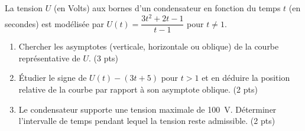 \documentclass[11pt]{article}
\begin{document}
\begin{exercice}
La tension $U$ (en Volts) aux bornes d'un condensateur en fonction du temps $t$ (en secondes) est modélisée par $U(t) = \dfrac{3t^2 + 2t - 1}{t - 1}$ pour $t \neq 1$.
\begin{enumerate}
    \item Chercher les asymptotes (verticale, horizontale ou oblique) de la courbe représentative de $U$. (3 pts)
    \item Étudier le signe de $U(t) - (3t + 5)$ pour $t > 1$ et en déduire la position relative de la courbe par rapport à son asymptote oblique. (2 pts)
    \item Le condensateur supporte une tension maximale de \SI{100}{V}. Déterminer l'intervalle de temps pendant lequel la tension reste admissible. (2 pts)
\end{enumerate}
\end{exercice}
\end{document}
